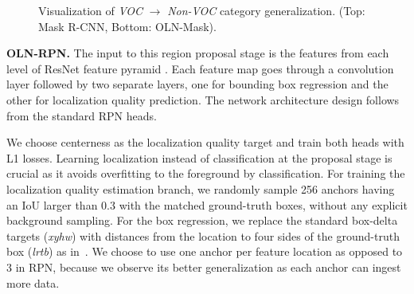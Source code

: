 \documentclass[10pt,twocolumn,letterpaper]{article}
\renewcommand{\paragraph}[1]{\vspace{1mm}\noindent\textbf{#1}}
\begin{document}
\begin{figure*}[]
\begin{center}
\vspace{-3mm}
\end{center}
\caption{\small{Visualization of \textit{VOC} $\rightarrow$ \textit{Non-VOC} category generalization. (Top: Mask R-CNN, Bottom: OLN-Mask).}}
\label{fig:coco}
\end{figure*}


\paragraph{OLN-RPN.} \quad
The input to this region proposal stage is the features from each level of ResNet feature pyramid \cite{lin2017feature}. Each feature map goes through a convolution layer followed by two separate layers, one for bounding box regression and the other for localization quality prediction. The network architecture design follows from the standard RPN heads.


We choose centerness \cite{tian2019fcos} as the localization quality target and train both heads with L1 losses. Learning localization instead of classification at the proposal stage is crucial as it avoids overfitting to the foreground by classification. For training the localization quality estimation branch, we randomly sample 256 anchors having an IoU larger than 0.3 with the matched ground-truth boxes, without any explicit background sampling. For the box regression, we replace the standard box-delta targets (\textit{xyhw}) with distances from the location to four sides of the ground-truth box (\textit{lrtb}) as in~\cite{tian2019fcos}. We choose to use one anchor per feature location as opposed to 3 in RPN, because we observe its better generalization as each anchor can ingest more data.
\end{document}
